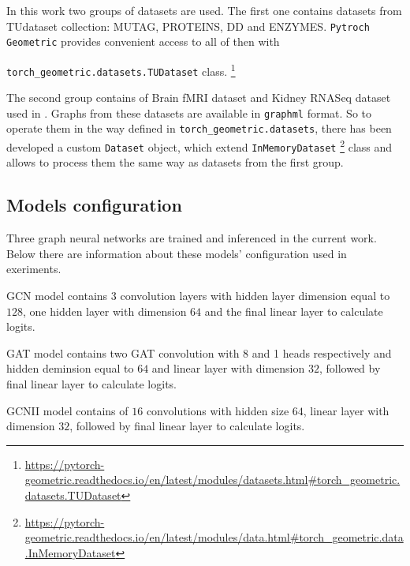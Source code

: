 


In this work two groups of datasets are used. The first one contains datasets from TUdataset\cite{TUDataset}
collection: MUTAG, PROTEINS, DD and ENZYMES. \texttt{Pytroch Geometric} provides convenient access to all of then with

\texttt{torch\_geometric.datasets.TUDataset} class.
\footnote{\url{https://pytorch-geometric.readthedocs.io/en/latest/modules/datasets.html\#torch_geometric.datasets.TUDataset}}


The second group contains of Brain fMRI dataset and Kidney RNASeq dataset used in \cite{Netpro2vec}. Graphs from
these datasets are available in \texttt{graphml} format. So to operate them in the way
defined in \texttt{torch\_geometric.datasets}, there has been developed a custom \texttt{Dataset} object, which
extend \texttt{InMemoryDataset} \footnote{\url{https://pytorch-geometric.readthedocs.io/en/latest/modules/data.html\#torch_geometric.data.InMemoryDataset}}
class and allows to process them the same way as datasets from the first group.

\subsection{Models configuration}

Three graph neural networks are trained and inferenced in the current work. Below there are information
about these models' configuration used in exeriments.

GCN model contains 3 convolution layers with hidden layer dimension equal to $128$,
one hidden layer with dimension $64$ and the final linear layer to calculate logits.

GAT model contains two GAT convolution with 8 and 1 heads respectively and hidden deminsion equal to $64$
and linear layer with dimension $32$, followed by  final linear layer to calculate logits.

GCNII model contains of $16$ convolutions with hidden size $64$,  linear layer with dimension $32$,
followed by  final linear layer to calculate logits.


